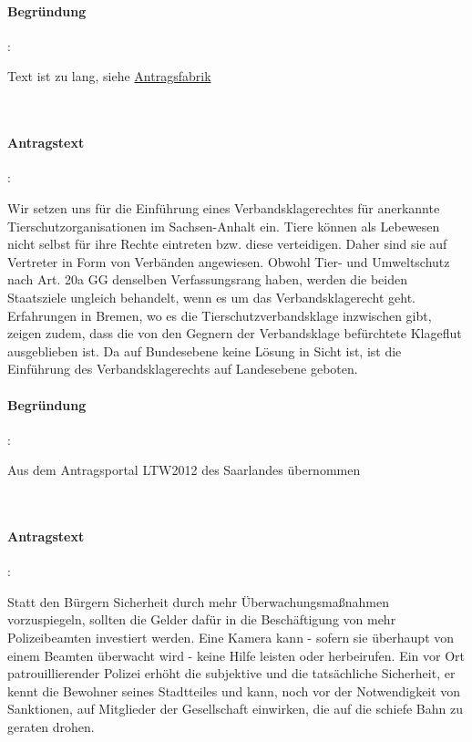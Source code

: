 \paragraph{Begründung}:

Text ist zu lang, siehe \href{http://wiki.piratenpartei.de/LSA:Landesverband/Organisation/Mitgliederversammlung/2012.1/Antragsfabrik/Fl\%C3\%A4chendeckendes_barrierefreies_Notruf-_und_Informationssystem_per_Mobilfunk_\%28SMS-Notruf\%29}{Antragsfabrik}


\\

\paragraph{Antragstext}:

Wir setzen uns für die Einführung eines Verbandsklagerechtes für anerkannte Tierschutzorganisationen im Sachsen-Anhalt ein. Tiere können als Lebewesen nicht selbst für ihre Rechte eintreten bzw. diese verteidigen. Daher sind sie auf Vertreter in Form von Verbänden angewiesen. Obwohl Tier- und Umweltschutz nach Art. 20a GG denselben Verfassungsrang haben, werden die beiden Staatsziele ungleich behandelt, wenn es um das Verbandsklagerecht geht. Erfahrungen in Bremen, wo es die Tierschutzverbandsklage inzwischen gibt, zeigen zudem, dass die von den Gegnern der Verbandsklage befürchtete Klageflut ausgeblieben ist. Da auf Bundesebene keine Lösung in Sicht ist, ist die Einführung des Verbandsklagerechts auf Landesebene geboten.

\paragraph{Begründung}:

Aus dem Antragsportal LTW2012 des Saarlandes übernommen


\\

\paragraph{Antragstext}:

Statt den Bürgern Sicherheit durch mehr Überwachungsmaßnahmen vorzuspiegeln, sollten die Gelder dafür in die Beschäftigung von mehr Polizeibeamten investiert werden. Eine Kamera kann - sofern sie überhaupt von einem Beamten überwacht wird - keine Hilfe leisten oder herbeirufen. Ein vor Ort patrouillierender Polizei erhöht die subjektive und die tatsächliche Sicherheit, er kennt die Bewohner {\Gu}seines{\Go} Stadtteiles und kann, noch vor der Notwendigkeit von Sanktionen, auf Mitglieder der Gesellschaft einwirken, die auf die schiefe Bahn zu geraten drohen.


